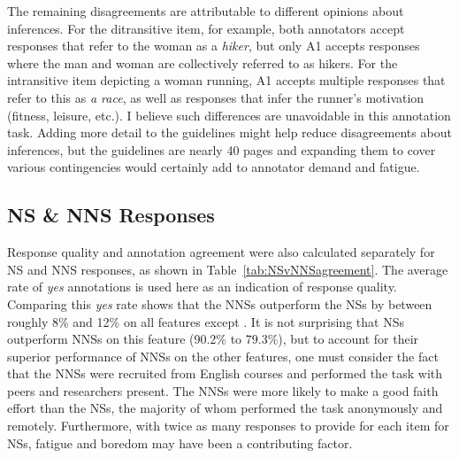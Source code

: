The remaining disagreements are attributable to different opinions about inferences.  For the ditransitive item, for example, both annotators accept responses that refer to the woman as a \textit{hiker}, but only A1 accepts responses where the man and woman are collectively referred to as hikers. For the intransitive item depicting a woman running, A1 accepts multiple responses that refer to this as \textit{a race}, as well as responses that infer the runner's motivation (fitness, leisure, etc.). I believe such differences are unavoidable in this annotation task. Adding more detail to the guidelines might help reduce disagreements about inferences, but the guidelines are nearly 40 pages and expanding them to cover various contingencies would certainly add to annotator demand and fatigue.

\subsection{NS \& NNS Responses}
\label{NSandNNSagreement}
Response quality and annotation agreement were also calculated separately for NS and NNS responses, as shown in Table~\ref{tab:NSvNNSagreement}. The average rate of \textit{yes} annotations is used here as an indication of response quality. Comparing this \textit{yes} rate shows that the NNSs outperform the NSs by between roughly 8\% and 12\% on all features except . It is not surprising that NSs outperform NNSs on this feature (90.2\% to 79.3\%), but to account for their superior performance of NNSs on the other features, one must consider the fact that the NNSs were recruited from English courses and performed the task with peers and researchers present. The NNSs were more likely to make a good faith effort than the NSs, the majority of whom performed the task anonymously and remotely. Furthermore, 
with twice as many responses to provide for each item for NSs, fatigue and boredom may have been a contributing factor.



